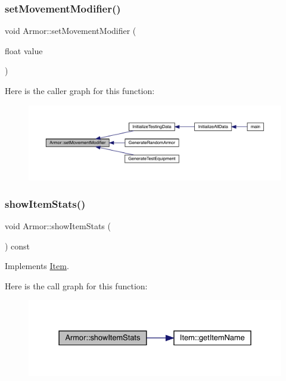 \subsubsection{\texorpdfstring{set\+Movement\+Modifier()}{setMovementModifier()}}
{\footnotesize\ttfamily void Armor\+::set\+Movement\+Modifier (\begin{DoxyParamCaption}\item[{float}]{value }\end{DoxyParamCaption})}

Here is the caller graph for this function\+:
\nopagebreak
\begin{figure}[H]
\begin{center}
\leavevmode
\includegraphics[width=350pt]{d9/d76/class_armor_a99475fc688add41f89b7fef160534e33_icgraph}
\end{center}
\end{figure}
\mbox{\label{class_armor_a4fe1507d7aaf280a18e19f51a6f8c42d}} 
\subsubsection{\texorpdfstring{show\+Item\+Stats()}{showItemStats()}}
{\footnotesize\ttfamily void Armor\+::show\+Item\+Stats (\begin{DoxyParamCaption}{ }\end{DoxyParamCaption}) const\hspace{0.3cm}{\ttfamily [virtual]}}



Implements \mbox{\hyperlink{class_item_aaf7dae41afdce432c11261043e8e4e30}{Item}}.

Here is the call graph for this function\+:
\nopagebreak
\begin{figure}[H]
\begin{center}
\leavevmode
\includegraphics[width=331pt]{d9/d76/class_armor_a4fe1507d7aaf280a18e19f51a6f8c42d_cgraph}
\end{center}
\end{figure}
\mbox{\label{class_armor_a72b3d5c0294e80243ed8c96dbc35ccc7}} 
